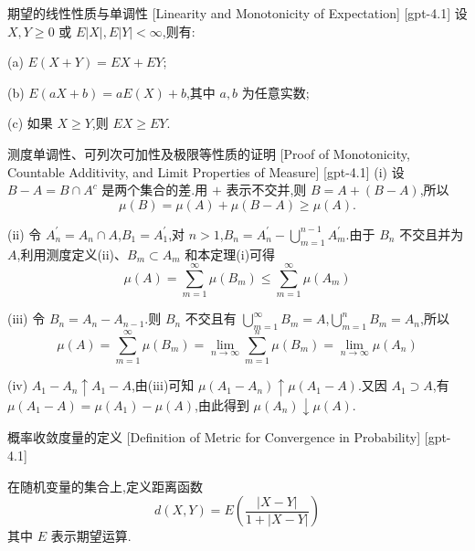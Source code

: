 \documentclass[UTF8]{ctexart}
\begin{document}
    
    
    \begin{thm}
        {期望的线性性质与单调性}
        [Linearity and Monotonicity of Expectation]
        [gpt-4.1]
        设 $X, Y \geq 0$ 或 $E|X|, E|Y| < \infty$,则有:

(a) $E(X + Y) = EX + EY$;

(b) $E(aX + b) = aE(X) + b$,其中 $a, b$ 为任意实数;

(c) 如果 $X \geq Y$,则 $EX \geq EY$.

    \end{thm}
    
    
    
    \begin{prf}
        {测度单调性、可列次可加性及极限等性质的证明}
        [Proof of Monotonicity, Countable Additivity, and Limit Properties of Measure]
        [gpt-4.1]
        (i) 设 $B - A = B \cap A^{c}$ 是两个集合的差.用 $+$ 表示不交并,则 $B = A + (B - A)$,所以
\[
\mu(B) = \mu(A) + \mu(B - A) \geq \mu(A).
\]

(ii) 令 $A_{n}^{\prime} = A_{n} \cap A$,$B_{1} = A_{1}^{\prime}$,对 $n > 1$,$B_{n} = A_{n}^{\prime} - \bigcup_{m=1}^{n-1} A_{m}^{\prime}$.由于 $B_{n}$ 不交且并为 $A$,利用测度定义(ii)、$B_{m} \subset A_{m}$ 和本定理(i)可得
\[
\mu(A) = \sum_{m=1}^{\infty} \mu(B_{m}) \leq \sum_{m=1}^{\infty} \mu(A_{m})
\]

(iii) 令 $B_{n} = A_{n} - A_{n-1}$.则 $B_{n}$ 不交且有 $\bigcup_{m=1}^{\infty} B_{m} = A$,$\bigcup_{m=1}^{n} B_{m} = A_{n}$,所以
\[
\mu(A) = \sum_{m=1}^{\infty} \mu(B_{m}) = \lim_{n \to \infty} \sum_{m=1}^{n} \mu(B_{m}) = \lim_{n \to \infty} \mu(A_{n})
\]

(iv) $A_{1} - A_{n} \uparrow A_{1} - A$,由(iii)可知 $\mu(A_{1} - A_{n}) \uparrow \mu(A_{1} - A)$.又因 $A_{1} \supset A$,有 $\mu(A_{1} - A) = \mu(A_{1}) - \mu(A)$,由此得到 $\mu(A_{n}) \downarrow \mu(A)$.

    \end{prf}
    
    
    
    \begin{dfn}
        {概率收敛度量的定义}
        [Definition of Metric for Convergence in Probability]
        [gpt-4.1]
        
在随机变量的集合上,定义距离函数
\[
d(X, Y) = E \left( \frac{|X - Y|}{1 + |X - Y|} \right)
\]
其中 $E$ 表示期望运算.

    \end{dfn}
    
\end{document}
